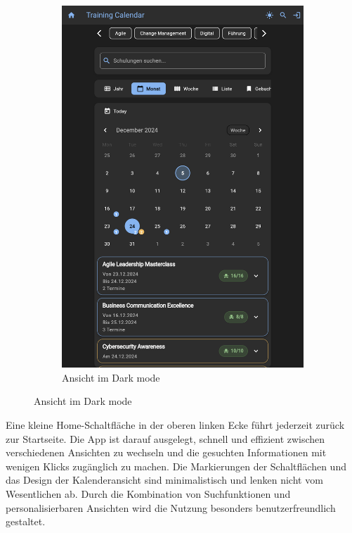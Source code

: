 \begin{figure}[htbp!]
\begin{subfigure}[b]{0.45\textwidth}
        \includegraphics[scale=0.2]{img/flutter_12.png}
        \caption{Ansicht im Dark mode}
        \label{fig:zweitens}
    \end{subfigure}
    \caption{ Ansicht im Dark mode}
    \label{fig:2}
\end{figure}

Eine kleine Home-Schaltfläche in der oberen linken Ecke führt jederzeit zurück zur Startseite. 
Die App ist darauf ausgelegt, schnell und effizient zwischen verschiedenen Ansichten zu wechseln und die gesuchten Informationen mit wenigen Klicks zugänglich zu machen. Die Markierungen der Schaltflächen und das Design der Kalenderansicht sind minimalistisch und lenken nicht vom Wesentlichen ab. Durch die Kombination von Suchfunktionen und personalisierbaren Ansichten wird die Nutzung besonders benutzerfreundlich gestaltet.

